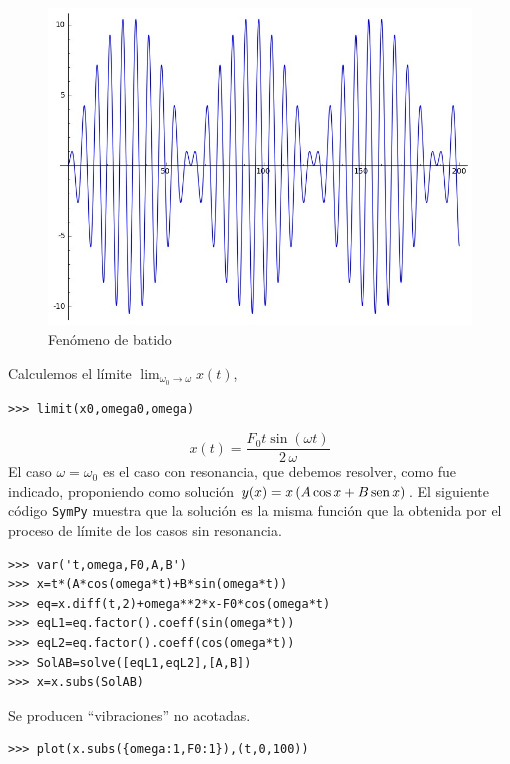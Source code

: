 \begin{figure}[h]
\begin{center}
\includegraphics[scale=.15]{imagenes/batido.jpg}
\end{center}
\caption{Fenómeno de batido}\label{fig:batido}
\end{figure}


Calculemos el límite $\lim_{\omega_0\to\omega}x(t)$,

\begin{lstlisting}
>>> limit(x0,omega0,omega)
\end{lstlisting}

\[x(t)=\frac{F_{0} t \sin\left(\omega t\right)}{2 \, \omega}
\]
El caso $\omega=\omega_0$ es el caso con resonancia, que debemos resolver, como fue indicado, proponiendo como solución $y(x)=x\left(A\cos x+ B\operatorname{sen} x\right)$. El siguiente código \texttt{SymPy} muestra que la solución es la misma función
que la obtenida por el proceso de límite de los casos sin resonancia.

\begin{lstlisting}
>>> var('t,omega,F0,A,B')
>>> x=t*(A*cos(omega*t)+B*sin(omega*t))
>>> eq=x.diff(t,2)+omega**2*x-F0*cos(omega*t)
>>> eqL1=eq.factor().coeff(sin(omega*t))
>>> eqL2=eq.factor().coeff(cos(omega*t))
>>> SolAB=solve([eqL1,eqL2],[A,B])
>>> x=x.subs(SolAB)
\end{lstlisting}



Se producen ``vibraciones'' no acotadas.
\begin{lstlisting}
>>> plot(x.subs({omega:1,F0:1}),(t,0,100))
\end{lstlisting}

